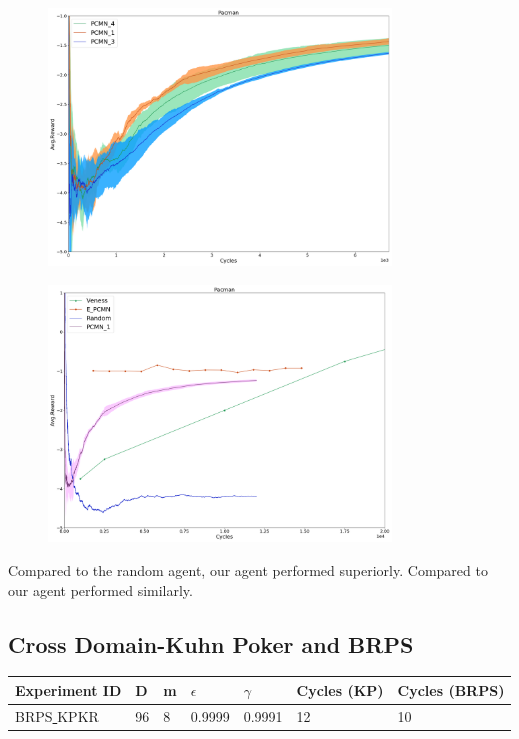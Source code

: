 \documentclass{article}
\theoremstyle{definition}
\newtheorem{primary statistics}[definition]{Primary Statistics}
\newtheorem{auxiliary statistics}[definition]{Auxiliary Statistics}
\begin{document}
 \begin{figure}[h]
 \centering
    \includegraphics[width=9.1cm]{4_Pacman}
\end{figure}

 \begin{figure}[h]
 \centering
    \includegraphics[width=9.1cm]{Pacman}
\end{figure}

Compared to the random agent, our agent performed superiorly. Compared to \citep{veness2011monte} our agent performed similarly.

\newpage


\subsection{Cross Domain-Kuhn Poker and BRPS }
 \begin{tabular}{|l|l|l|l|l|l|l|}
 \hline \centering
 Experiment ID& D & m & $\epsilon$ & $\gamma$ & Cycles (KP) & Cycles (BRPS) \\ \hline
BRPS\underline{ }KPKR  & 96       & 8           & 0.9999       & 0.9991             & 12    &  10      \\ \hline    
\end{tabular} \\
\end{document}
